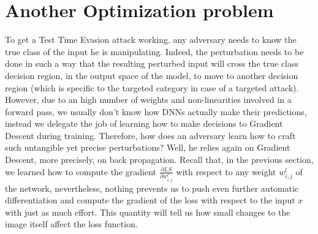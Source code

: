 \documentclass[LaM,binding=0.6cm]{./packages/sapthesis/sapthesis}
\begin{document}
    \section{Another Optimization problem}
        
        To get a Test Time Evasion attack working, any adversary needs to know the true class of the input he is manipulating. Indeed, the perturbation needs to be done in such a way that 
        the resulting perturbed input will cross the true class decision region, in the output space of the model, to move to another decision region (which is specific to the targeted category in case of a targeted attack).
        However, due to an high number of weights and non-linearities involved in a forward pass, we usually don't know how DNNs actually make their predictions, instead we delegate the job of learning 
        how to make decisions to Gradient Descent during training. Therefore, how does an adversary learn how to craft such untangible yet precise perturbations? Well, he relies again on Gradient Descent, more precisely,
        on back propagation. Recall that, in the previous section, we learned how to compute the gradient $\frac{\partial LS}{\partial w^{l}_{i,j}}$ with respect to any weight $ w^{l}_{i,j} $ of the 
        network, nevertheless, nothing prevents us to push even further automatic differentiation and compute the gradient of the loss with respect to the input $x$ with just as much effort. 
        This quantity will tell us how small changes to the image itself affect the loss function.
        
\end{document}
